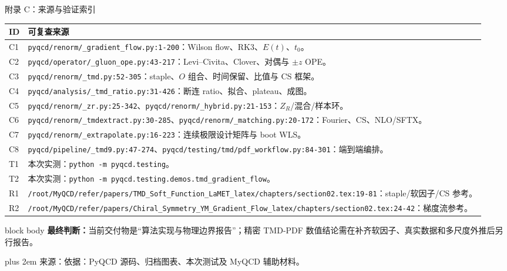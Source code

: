 \documentclass[UTF8,aspectratio=169,11pt]{ctexbeamer}
\renewcommand{\arraystretch}{0.92}
\newcommand{\source}[1]{%
  \par\vspace{0.02em}\begingroup\fontsize{6}{6.8}\selectfont\raggedright\sloppy
  \setlength{\emergencystretch}{3em}\rightskip=0pt plus 2em
  \color{muted}来源：#1\par\endgroup}
\begin{document}
\begin{frame}[t]{附录 C：来源与验证索引}
  \scriptsize
  \renewcommand{\arraystretch}{0.78}
  \begin{tabularx}{0.98\textwidth}{@{}p{}Y@{}}
    \toprule
    ID & 可复查来源\\
    \midrule
    C1 & \nolinkurl{pyqcd/renorm/_gradient_flow.py:1-200}：Wilson flow、RK3、\(E(t)\)、\(t_0\)。\\
    C2 & \nolinkurl{pyqcd/operator/_gluon_ope.py:43-217}：Levi--Civita、Clover、对偶与 \(\pm z\) OPE。\\
    C3 & \nolinkurl{pyqcd/renorm/_tmd.py:52-305}：staple、\(O\) 组合、时间保留、比值与 CS 框架。\\
    C4 & \nolinkurl{pyqcd/analysis/_tmd_ratio.py:31-426}：断连 ratio、拟合、plateau、成图。\\
    C5 & \nolinkurl{pyqcd/renorm/_zr.py:25-342}、\nolinkurl{pyqcd/renorm/_hybrid.py:21-153}：\(Z_R\)/混合/样本环。\\
    C6 & \nolinkurl{pyqcd/renorm/_tmdextract.py:30-285}、\nolinkurl{pyqcd/renorm/_matching.py:20-172}：Fourier、CS、NLO/SFTX。\\
    C7 & \nolinkurl{pyqcd/renorm/_extrapolate.py:16-223}：连续极限设计矩阵与 boot WLS。\\
    C8 & \nolinkurl{pyqcd/pipeline/_tmd9.py:47-274}、\nolinkurl{pyqcd/testing/tmd/pdf_workflow.py:84-301}：端到端编排。\\
    T1 & 本次实测：\texttt{python -m pyqcd.testing}。\\
    T2 & 本次实测：\texttt{python -m pyqcd.testing.demos.tmd\_gradient\_flow}。\\
    R1 & \nolinkurl{/root/MyQCD/refer/papers/TMD_Soft_Function_LaMET_latex/chapters/section02.tex:19-81}：staple/软因子/CS 参考。\\
    R2 & \nolinkurl{/root/MyQCD/refer/papers/Chiral_Symmetry_YM_Gradient_Flow_latex/chapters/section02.tex:24-42}：梯度流参考。\\
    \bottomrule
  \end{tabularx}
  \vspace{0.1em}
  \begin{beamercolorbox}[wd=0.98\textwidth,sep=0.35em,rounded=true]{block body}
    \textbf{最终判断：}当前交付物是“算法实现与物理边界报告”；精密 TMD-PDF 数值结论需在补齐软因子、真实数据和多尺度外推后另行报告。
  \end{beamercolorbox}
  \source{依据：PyQCD 源码、归档图表、本次测试及 MyQCD 辅助材料。}
\end{frame}
\end{document}
